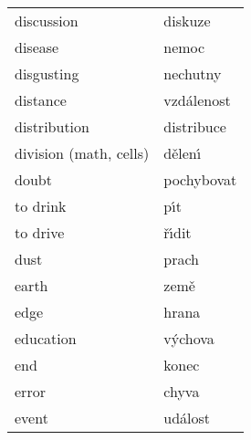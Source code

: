 \documentclass[11pt]{article}
\begin{document}
\begin{longtable}{ll}
 discussion               &  diskuze             \\
 disease                  &  nemoc               \\
 disgusting               &  nechutny            \\
 distance                 &  vzd\'alenost        \\
 distribution             &  distribuce          \\
 division (math, cells)   &  d\v elen\'\i        \\
 doubt                    &  pochybovat          \\
 to drink                 &  p\'\i t             \\
 to drive                 &  \v r\'\i dit        \\
 dust                     &  prach               \\
 earth                    &  zem\v e             \\
 edge                     &  hrana               \\
 education                &  v\'ychova           \\
 end                      &  konec               \\
 error                    &  chyva               \\
 event                    &  ud\'alost           \\
\end{longtable}
\end{document}
